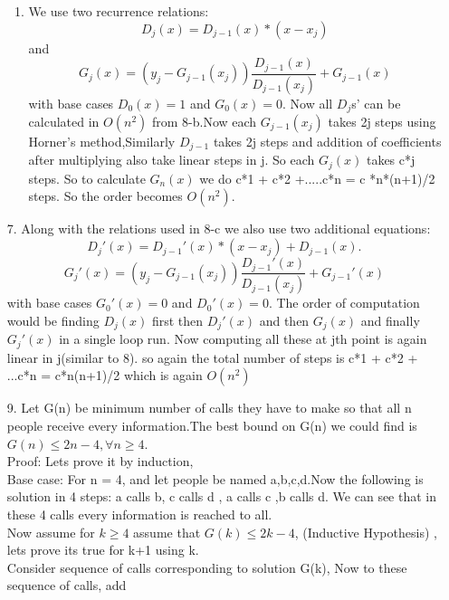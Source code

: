 \documentclass[12pt]{article}
\begin{document}
\begin{enumerate}
\begin{enumerate}
\item
We use two recurrence relations:
\begin{equation*}
D_j(x) = D_{j-1}(x) *(x - x_{j})
\end{equation*}
and 
\begin{equation*}
G_j(x) = (y_j - G_{j-1}(x_j)) \frac{D_{j-1}(x)}{D_{j-1}(x_j)} + G_{j-1}(x)
\end{equation*}
with base cases $D_0(x) = 1$ and $G_0(x) = 0$.
Now all $D_j$s' can be calculated in $O(n^2)$ from 8-b.Now each $G_{j-1}(x_j)$ takes 2j steps using Horner's method,Similarly $D_{j-1}$ takes 2j steps and addition of coefficients after multiplying also take linear steps in j.
So each $G_j(x)$ takes c*j steps. So to calculate $G_n(x)$ we do c*1 + c*2 +.....c*n = c *n*(n+1)/2 steps. So the order becomes $O(n^2)$.
\end{enumerate}
 \item[7.]
    Along with the relations used in 8-c we also use two additional equations:
    \begin{equation*}
        D_j'(x) = D_{j-1}'(x) * (x-x_j) + D_{j-1}(x).
    \end{equation*}
    \begin{equation*}
        G_j'(x) = (y_j - G_{j-1}(x_j)) \frac{D_{j-1}'(x)}{D_{j-1}(x_j)} + G_{j-1}'(x)
    \end{equation*}
    with base cases $G_0'(x) = 0$ and $D_0'(x) = 0$.
    The order of computation would be finding $D_j(x)$ first then $D_j'(x)$ and then $G_j(x)$ and finally $G_j'(x)$ in a single loop run.
    Now computing all these at jth point is again linear in j(similar to 8). so again the total number of steps is c*1 + c*2 + ...c*n = c*n(n+1)/2 which is again $O(n^2)$
    \item[9.]
    Let G(n) be minimum number of calls they have to make so that all n people receive every information.The best bound on G(n) we could find is $G(n) \leq 2n - 4, \forall n \geq 4$.
    \\Proof:
    Lets prove it by induction,
    \\Base case:
    For n = 4, and let people be named a,b,c,d.Now the following is solution in 4 steps:
    a calls b, c calls d , a calls c ,b calls d.
    We can see that in these 4 calls every information is reached to all.
    \\Now assume for $k \geq 4$ assume that $G(k) \leq 2k - 4$, (Inductive Hypothesis) , lets prove its true for k+1 using k.
    \\Consider sequence of calls corresponding to solution G(k), Now to these sequence of calls, add

\end{enumerate}
\end{document}
